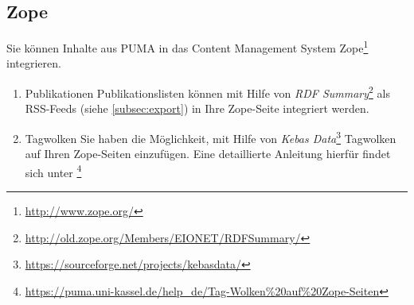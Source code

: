 \subsection{Zope}
\label{subsec:zope}
Sie können Inhalte aus PUMA in das Content Management System Zope\footnote{\url{http://www.zope.org/}} integrieren.
\begin{enumerate}
    \item Publikationen\newline
    Publikationslisten können mit Hilfe von \textit{RDF Summary}\footnote{\url{http://old.zope.org/Members/EIONET/RDFSummary/}} als RSS-Feeds (siehe \autoref{subsec:export}) in Ihre Zope-Seite integriert werden. 
    \item Tagwolken\newline
    Sie haben die Möglichkeit, mit Hilfe von \textit{Kebas Data}\footnote{\url{https://sourceforge.net/projects/kebasdata/}} Tagwolken auf Ihren Zope-Seiten einzufügen. Eine detaillierte Anleitung hierfür findet sich unter \footnote{\url{https://puma.uni-kassel.de/help_de/Tag-Wolken\%20auf\%20Zope-Seiten}}
%  
%

\end{enumerate}
